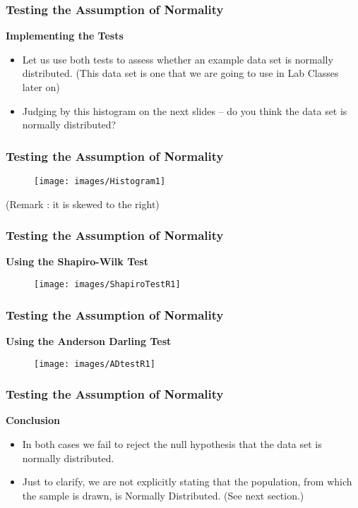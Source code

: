 \documentclass{beamer}
\begin{document}
		\begin{frame}
			\frametitle{Testing the Assumption of Normality}
			\Large	
			\textbf{Implementing the Tests}
			\begin{itemize}		
			\item	Let us use both tests to assess whether an example data set is normally distributed. (This data set is one that we are going to use in Lab Classes later on) 
			\item	Judging by this histogram on the next slides – do you think the data set is normally distributed?
		\end{itemize}

	\end{frame}
	
	
	\begin{frame}
		\frametitle{Testing the Assumption of Normality}
		\Large
		\begin{figure}
\centering
\texttt{[image: images/Histogram1]}
\end{figure}
(Remark : it is skewed to the right)
\end{frame}
\begin{frame}
\frametitle{Testing the Assumption of Normality}
\Large	
\textbf{Using the Shapiro-Wilk Test}		
\begin{figure}
\centering
\texttt{[image: images/ShapiroTestR1]}
\end{figure}
\end{frame}
\begin{frame}
\frametitle{Testing the Assumption of Normality}
\Large	
\textbf{Using the Anderson Darling Test}	
\begin{figure}
\centering
\texttt{[image: images/ADtestR1]}

\end{figure}

			
		\end{frame}
	\begin{frame}
		\frametitle{Testing the Assumption of Normality}
		\Large
	\textbf{Conclusion}
	\begin{itemize}
	\item	In both cases we fail to reject the null hypothesis that the data set is normally distributed.
  \item Just to clarify, we are not explicitly stating that the population, from which the sample is drawn, is Normally Distributed. (See next section.)
	\end{itemize}
	\end{frame}
	
\end{document}

